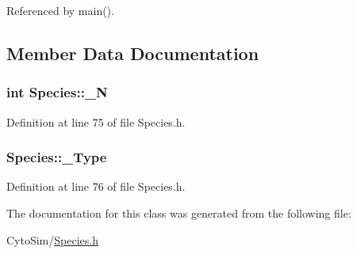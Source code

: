 Referenced by main().



\subsection{Member Data Documentation}
\hypertarget{classSpecies_aaf64f0a20dc213a6f03c69e7c3caa43a}{
\subsubsection[{\-\_\-\-N}]{\setlength{\rightskip}{0pt plus 5cm}int {\bf Species\-::\-\_\-\-N}}}\label{classSpecies_aaf64f0a20dc213a6f03c69e7c3caa43a}


Definition at line 75 of file Species.\-h.

\hypertarget{classSpecies_ae80ccbaa2b115cea250b7f87ce517105}{
\subsubsection[{\-\_\-\-Type}]{ {\bf Species\-::\-\_\-\-Type}}}\label{classSpecies_ae80ccbaa2b115cea250b7f87ce517105}


Definition at line 76 of file Species.\-h.



The documentation for this class was generated from the following file\-:\begin{DoxyCompactItemize}
\item 
Cyto\-Sim/\hyperlink{Species_8h}{Species.\-h}\end{DoxyCompactItemize}
